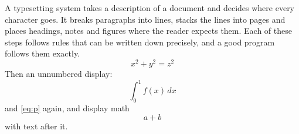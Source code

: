 \documentclass{article}
\begin{document}
A typesetting system takes a description of a document and decides where every character goes. It breaks paragraphs into lines, stacks the lines into pages and places headings, notes and figures where the reader expects them. Each of these steps follows rules that can be written down precisely, and a good program follows them exactly.
\begin{equation}
x^2 + y^2 = z^2 \label{eq:p}
\end{equation}
Then an unnumbered display:
\begin{equation*}
\int_0^1 f(x)\,dx
\end{equation*}
and \eqref{eq:p} again, and display math
\[ a + b \]
with text after it.
\end{document}
